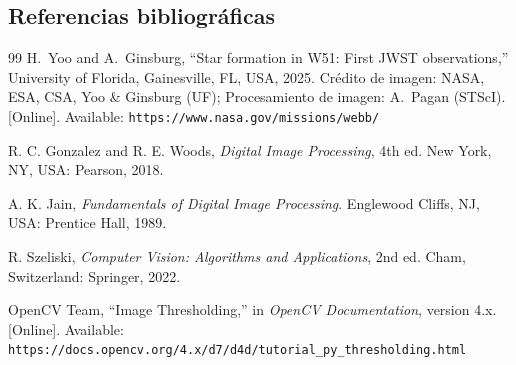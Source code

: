 \documentclass[11pt]{article}
\begin{document}
\subsection{Referencias bibliográficas}
{
    \renewcommand{\refname}{}
    \vspace{-1.5em}

    \begin{thebibliography}{99}
        H.~Yoo and A.~Ginsburg, ``Star formation in W51: First JWST observations,'' University of Florida, Gainesville, FL, USA, 2025. Crédito de imagen: NASA, ESA, CSA, Yoo \& Ginsburg (UF); Procesamiento de imagen: A.~Pagan (STScI). [Online]. Available: \texttt{https://www.nasa.gov/missions/webb/}

        R. C. Gonzalez and R. E. Woods, \textit{Digital Image Processing}, 4th ed. New York, NY, USA: Pearson, 2018.

        A. K. Jain, \textit{Fundamentals of Digital Image Processing}. Englewood Cliffs, NJ, USA: Prentice Hall, 1989.

        R. Szeliski, \textit{Computer Vision: Algorithms and Applications}, 2nd ed. Cham, Switzerland: Springer, 2022.

        OpenCV Team, ``Image Thresholding,'' in \textit{OpenCV Documentation}, version 4.x. [Online]. Available: \texttt{https://docs.opencv.org/4.x/d7/d4d/tutorial\_py\_thresholding.html}
    \end{thebibliography}
}
\end{document}
